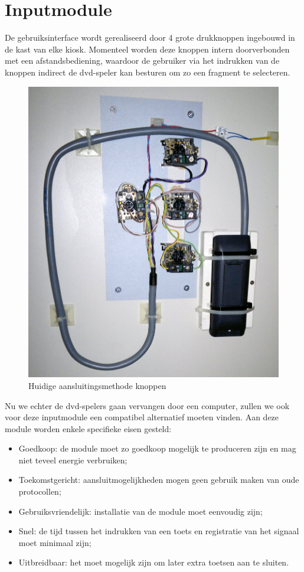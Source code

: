 \section{Inputmodule}
\label{ontwerp:hardware:input}

De gebruiksinterface wordt gerealiseerd door 4 grote drukknoppen ingebouwd in de kast van elke kiosk. Momenteel worden deze knoppen intern doorverbonden met een afstandsbediening, waardoor de gebruiker via het indrukken van de knoppen indirect de \acs{dvd}-speler kan besturen om zo een fragment te selecteren.

\begin{figure}
	\includegraphics[width=\textwidth]{afbeeldingen/kiosk_knoppen}
	\caption{Huidige aansluitingsmethode knoppen}
\end{figure}

Nu we echter de \acs{dvd}-spelers gaan vervangen door een computer, zullen we ook voor deze inputmodule een compatibel alternatief moeten vinden. Aan deze module worden enkele specifieke eisen gesteld:
\begin{itemize}
\item Goedkoop: de module moet zo goedkoop mogelijk te produceren zijn en mag niet teveel energie verbruiken;
\item Toekomstgericht: aansluitmogelijkheden mogen geen gebruik maken van oude protocollen;
\item Gebruiksvriendelijk: installatie van de module moet eenvoudig zijn;
\item Snel: de tijd tussen het indrukken van een toets en registratie van het signaal moet minimaal zijn;
\item Uitbreidbaar: het moet mogelijk zijn om later extra toetsen aan te sluiten.
\end{itemize}

